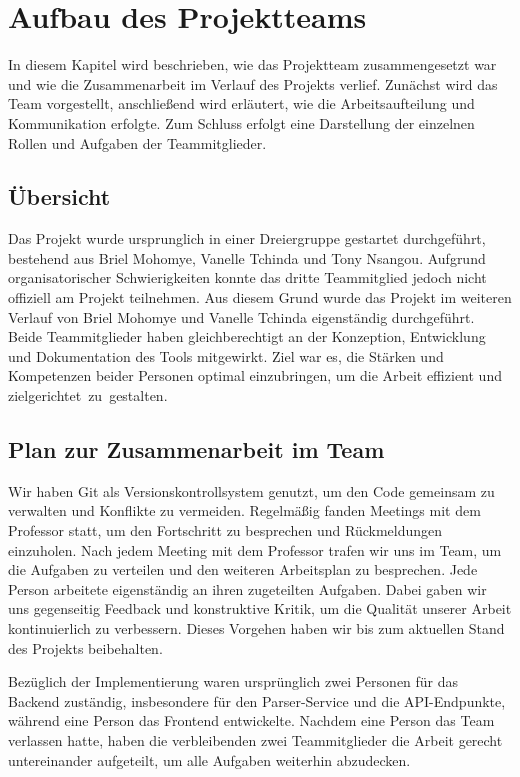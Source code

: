 \chapter{Aufbau des Projektteams}
In diesem Kapitel wird beschrieben, wie das Projektteam zusammengesetzt war 
und wie die Zusammenarbeit im Verlauf des Projekts verlief. Zunächst 
wird das Team vorgestellt, anschließend wird erläutert, wie die 
Arbeitsaufteilung und Kommunikation erfolgte. Zum Schluss erfolgt eine 
Darstellung der einzelnen Rollen und Aufgaben der Teammitglieder.

\section{Übersicht}
Das Projekt wurde ursprunglich in einer Dreiergruppe gestartet durchgeführt, 
bestehend aus Briel Mohomye, Vanelle Tchinda und Tony Nsangou. Aufgrund 
organisatorischer Schwierigkeiten konnte das dritte Teammitglied jedoch 
nicht offiziell am Projekt teilnehmen. Aus diesem Grund wurde das Projekt 
im weiteren Verlauf von Briel Mohomye und Vanelle Tchinda eigenständig 
durchgeführt. Beide Teammitglieder haben gleichberechtigt an der Konzeption, 
Entwicklung und Dokumentation des Tools mitgewirkt. Ziel war es, 
die Stärken und Kompetenzen beider Personen optimal einzubringen, 
um die Arbeit effizient und zielgerichtet zu gestalten.

\section{Plan zur Zusammenarbeit im Team}
Wir haben Git als Versionskontrollsystem genutzt, um den Code gemeinsam zu
verwalten und Konflikte zu vermeiden. Regelmäßig fanden Meetings mit dem Professor  statt, 
um den Fortschritt zu besprechen und Rückmeldungen einzuholen. Nach jedem 
Meeting mit dem Professor trafen wir uns im Team, um die Aufgaben zu 
verteilen und den weiteren Arbeitsplan zu besprechen.
Jede Person arbeitete eigenständig an ihren zugeteilten Aufgaben.
Dabei gaben wir uns gegenseitig Feedback und konstruktive Kritik,
um die Qualität unserer Arbeit kontinuierlich zu verbessern. 
Dieses Vorgehen haben wir bis zum aktuellen Stand des Projekts beibehalten.

Bezüglich der Implementierung waren ursprünglich zwei Personen für das Backend zuständig,
insbesondere für den Parser-Service und die API-Endpunkte, während eine Person
das Frontend entwickelte. Nachdem eine Person das Team verlassen hatte,
haben die verbleibenden zwei Teammitglieder die Arbeit gerecht untereinander aufgeteilt, 
um alle Aufgaben weiterhin abzudecken.


